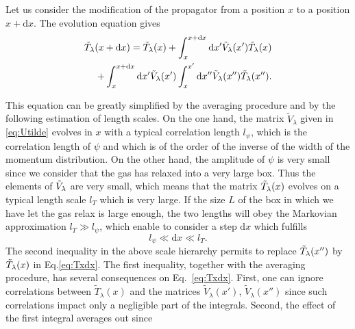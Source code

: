 \documentclass[submission,Phys,10pt]{SciPost}%
\begin{document}
    
Let us consider the modification of the propagator  from a position $x$ to a position $x+\mathrm{d}x$. The evolution equation gives 
\begin{equation}
\begin{split}
        \Tilde{T}_{\lambda}(x+\mathrm{d}x)=\Tilde{T}_{\lambda}(x)+\int_{x}^{x+\mathrm{d}x}\mathrm{d}x' \Tilde{V}_{\lambda}(x')\Tilde{T}_{\lambda}(x)
        \\+\int_{x}^{x+\mathrm{d}x}\mathrm{d}x' \Tilde{V}_{\lambda}(x')\int_{x}^{x'}\mathrm{d}x'' \Tilde{V}_{\lambda}(x'')\Tilde{T}_{\lambda}(x'').
        \end{split}
        \label{eq:Txdx}
\end{equation}

This equation can be greatly simplified by the averaging %
procedure
and by the following estimation of length scales. On the one hand, the matrix $\tilde{V}_\lambda$ given in \eqref{eq:Utilde} evolves in $x$ with a typical correlation length $l_\psi$, which is the correlation length of $\psi$ and which is of the order of the inverse of the 
width of the momentum distribution. On the other hand, the amplitude of $\psi$ is very small since we consider that the gas has relaxed into a very large box. Thus the elements of $\Tilde{V}_{\lambda}$ are very small, which means that the matrix $\Tilde{T}_{\lambda}(x)$ evolves on a typical length scale $l_T$ which is very large.  If the size $L$ of the box in which we have let the gas relax is large enough, the two lengths will obey the Markovian approximation  $l_T\gg l_\psi$, which enable to 
consider a step $\mathrm{d}x$ which fulfills 
\begin{equation}
    l_\psi \ll \mathrm{d}x \ll l_T.
\end{equation} %
The second inequality in the above scale hierarchy permits to replace $\Tilde{T}_{\lambda}(x'')$ by $\Tilde{T}_{\lambda}(x)$ in Eq.\eqref{eq:Txdx}. The first inequality, together with the averaging procedure, has several consequences on Eq.~\eqref{eq:Txdx}. First, one can ignore correlations between $\tilde{T}_\lambda(x)$ and the 
matrices $\tilde{V}_\lambda(x')$, $\tilde{V}_\lambda(x'')$ since such correlations impact only a negligible part of the integrals. Second,  the effect of the first integral averages out since
\end{document}
